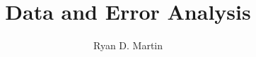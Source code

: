 \documentclass[11pt]{report}
\begin{document}
\title{Data and Error Analysis}
\author{Ryan D. Martin}
\maketitle

\tableofcontents

%







%
%
%
\end{document}
